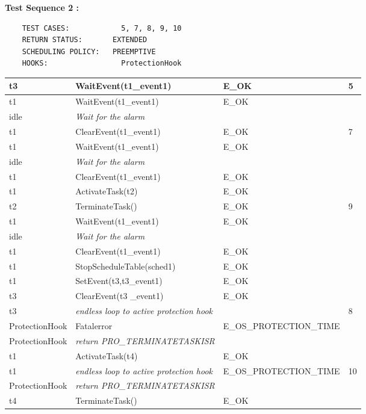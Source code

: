\documentclass[10pt]{article}
\newlength{\Li}\settowidth{\Li}{Running}
\newlength{\Lii}\setlength{\Lii}{7cm}
\newlength{\Liiii}\setlength{\Liiii}{0.9cm}
\newlength{\Liii}\setlength{\Liii}{\textwidth} \addtolength{\Liii}{-\Li} \addtolength{\Liii}{-\Lii} \addtolength{\Liii}{-\Liiii}
\begin{document}
	\textbf{Test Sequence 2 :}
	\begin{lstlisting}
	TEST CASES:		       5, 7, 8, 9, 10
	RETURN STATUS:	  	 EXTENDED
	SCHEDULING POLICY:   PREEMPTIVE
	HOOKS:		           ProtectionHook
	\end{lstlisting}
	

	\begin{supertabular}{|p{\Li}|p{\Lii}|p{\Liii}|p{\Liiii}|} \hline 
	t3	& WaitEvent(t1\_event1)							& E\_OK											& 5 \\ \hline
	t1	& WaitEvent(t1\_event1)							& E\_OK											& \\ \hline
	idle	& \textit{Wait for the alarm}					& 												& \\ \hline
	t1	& ClearEvent(t1\_event1)						& E\_OK											& 7 \\ \hline
	t1	& WaitEvent(t1\_event1)							& E\_OK											& \\ \hline
	idle	& \textit{Wait for the alarm}					& 												& \\ \hline
	t1	& ClearEvent(t1\_event1)						& E\_OK											& \\ \hline
	t1	& ActivateTask(t2)							& E\_OK											& \\ \hline
	t2	& TerminateTask()							& E\_OK											& 9 \\ \hline
	t1	& WaitEvent(t1\_event1)							& E\_OK											& \\ \hline
	idle	& \textit{Wait for the alarm}					& 												& \\ \hline
	t1	& ClearEvent(t1\_event1)						& E\_OK											& \\ \hline
	t1	& StopScheduleTable(sched1)					& E\_OK											& \\ \hline
	t1	& SetEvent(t3,t3\_event1)						& E\_OK											& \\ \hline
	t3	& ClearEvent(t3 \_event1)						& E\_OK											& \\ \hline
	t3	& \textit{endless loop to active protection hook}		& 												& 8 \\ \hline
	ProtectionHook		& Fatalerror					& E\_OS\_PROTECTION\_TIME 						& \\ \hline
	ProtectionHook		& \textit{return PRO\_TERMINATETASKISR}	& & \\ \hline
	t1	& ActivateTask(t4)							& E\_OK											& \\ \hline
	t1	& \textit{endless loop to active protection hook}		& E\_OS\_PROTECTION\_TIME						& 10 \\ \hline
	ProtectionHook		& \textit{return PRO\_TERMINATETASKISR}	& & \\ \hline
	t4	& TerminateTask()							& E\_OK											& \\ \hline
	\end{supertabular}\\
\end{document}
